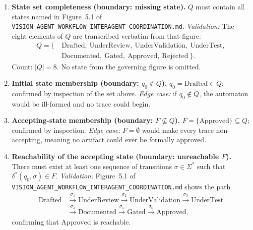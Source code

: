 \documentclass[12pt]{article}
\theoremstyle{definition}
\newcommand{\code}[1]{\texttt{#1}}
\newcommand{\VisionFlow}{\code{VISION\_AGENT\_\allowbreak WORKFLOW\_\allowbreak INTERAGENT\_\allowbreak COORDINATION.md}}
\begin{document}
\begin{enumerate}[label=\textbf{S\arabic*.}, leftmargin=*, widest=S9]

  \item \textbf{State set completeness (boundary: missing state).}
        $Q$ must contain all states named in Figure~5.1 of
        \VisionFlow{}.
        \emph{Validation:} The eight elements of $Q$ are transcribed
        verbatim from that figure:
        \begin{align*}
          Q = \{\ &\mathrm{Drafted},\ \mathrm{UnderReview},\
                   \mathrm{UnderValidation},\ \mathrm{UnderTest}, \\
                  &\mathrm{Documented},\ \mathrm{Gated},\
                   \mathrm{Approved},\ \mathrm{Rejected}\ \}.
        \end{align*}
        Count: $|Q| = 8$.  No state from the governing figure is
        omitted.

  \item \textbf{Initial state membership (boundary: $q_0 \notin Q$).}
        $q_0 = \mathrm{Drafted} \in Q$; confirmed by inspection of
        the set above.
        \emph{Edge case:} if $q_0 \notin Q$, the automaton would be
        ill-formed and no trace could begin.

  \item \textbf{Accepting-state membership (boundary: $F \not\subseteq
        Q$).}
        $F = \{\mathrm{Approved}\} \subseteq Q$; confirmed by
        inspection.
        \emph{Edge case:} $F = \emptyset$ would make every trace
        non-accepting, meaning no artifact could ever be formally
        approved.

  \item \textbf{Reachability of the accepting state (boundary:
        unreachable $F$).}
        There must exist at least one sequence of transitions
        $\sigma \in \Sigma^{*}$ such that
        $\delta^{*}(q_0, \sigma) \in F$.
        \emph{Validation:} Figure~5.1 of \VisionFlow{} shows the
        path
        \begin{align*}
          \mathrm{Drafted}
            &\xrightarrow{\,\sigma_1\,} \mathrm{UnderReview}
             \xrightarrow{\,\sigma_2\,} \mathrm{UnderValidation}
             \xrightarrow{\,\sigma_3\,} \mathrm{UnderTest} \\
            &\xrightarrow{\,\sigma_4\,} \mathrm{Documented}
             \xrightarrow{\,\sigma_5\,} \mathrm{Gated}
             \xrightarrow{\,\sigma_6\,} \mathrm{Approved},
        \end{align*}
        confirming that $\mathrm{Approved}$ is reachable.


\end{enumerate}
\end{document}
